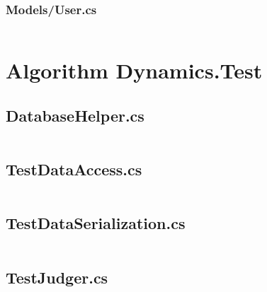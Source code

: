 \documentclass[a4paper]{report}
\begin{document}
\inputminted{csharp}{"../src/Algorithm Dynamics.Core/TestCaseResult.cs"}

\subsubsection{Models/User.cs}

\inputminted{csharp}{"../src/Algorithm Dynamics.Core/User.cs"}

\section{Algorithm Dynamics.Test}

\subsection{DatabaseHelper.cs}

\inputminted{csharp}{"../src/Algorithm Dynamics.Test/DatabaseHelper.cs"}

\subsection{TestDataAccess.cs}

\inputminted{csharp}{"../src/Algorithm Dynamics.Test/TestDataAccess.cs"}

\subsection{TestDataSerialization.cs}

\inputminted{csharp}{"../src/Algorithm Dynamics.Test/TestDataSerialization.cs"}

\subsection{TestJudger.cs}

\inputminted{csharp}{"../src/Algorithm Dynamics.Test/TestJudger.cs"}

\setcounter{biburlnumpenalty}{9000}
\setcounter{biburllcpenalty}{9000}
\setcounter{biburlucpenalty}{9000}

\printbibliography[
    heading=bibintoc,
    title={Bibliography}
]
\end{document}
